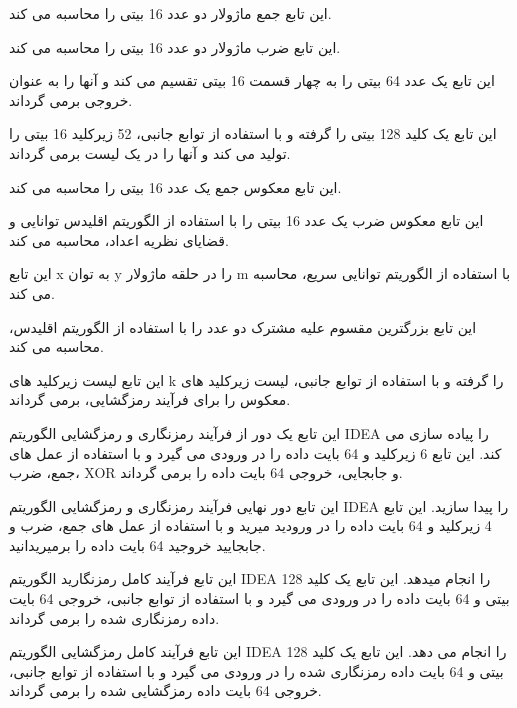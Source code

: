 \begin{boxB}
    
    این تابع جمع ماژولار دو عدد 16 بیتی را محاسبه می کند.
    
    
این تابع ضرب ماژولار دو عدد 16 بیتی را محاسبه می کند.

    
این تابع یک عدد 64 بیتی را به چهار قسمت 16 بیتی تقسیم می کند و آنها را به عنوان خروجی برمی گرداند.



این تابع یک کلید 128 بیتی را گرفته و با استفاده از توابع جانبی، 52 زیرکلید 16 بیتی را تولید می کند و آنها را در یک لیست برمی گرداند.


این تابع معکوس جمع یک عدد 16 بیتی را محاسبه می کند.



این تابع معکوس ضرب یک عدد 16 بیتی را با استفاده از الگوریتم اقلیدس توانایی و قضایای نظریه اعداد، محاسبه می کند.


این تابع x به توان y را در حلقه ماژولار m با استفاده از الگوریتم توانایی سریع، محاسبه می کند.


این تابع بزرگترین مقسوم علیه مشترک دو عدد را با استفاده از الگوریتم اقلیدس، محاسبه می کند.


این تابع لیست زیرکلید های k را گرفته و با استفاده از توابع جانبی، لیست زیرکلید های معکوس را برای فرآیند رمزگشایی، برمی گرداند.


این تابع یک دور از فرآیند رمزنگاری و رمزگشایی الگوریتم IDEA را پیاده سازی می کند. این تابع 6 زیرکلید و 64 بایت داده را در ورودی می گیرد و با استفاده از عمل های جمع، ضرب، XOR و جابجایی، خروجی 64 بایت داده را برمی گرداند.


این تابع دور نهایی فرآیند رمزنگاری و رمزگشایی الگوریتم IDEA را پیدا سازید. این تابع 4 زیرکلید و 64 بایت داده را در ورودید میرید و با استفاده از عمل های جمع، ضرب و جابجایید خروجید 64 بایت داده را برمیریدانید.


این تابع فرآیند کامل رمزنگارید الگوریتم IDEA را انجام میدهد. این تابع یک کلید 128 بیتی و 64 بایت داده را در ورودی می گیرد و با استفاده از توابع جانبی، خروجی 64 بایت داده رمزنگاری شده را برمی گرداند.


این تابع فرآیند کامل رمزگشایی الگوریتم IDEA را انجام می دهد. این تابع یک کلید 128 بیتی و 64 بایت داده رمزنگاری شده را در ورودی می گیرد و با استفاده از توابع جانبی، خروجی 64 بایت داده رمزگشایی شده را برمی گرداند.


\end{boxB}

